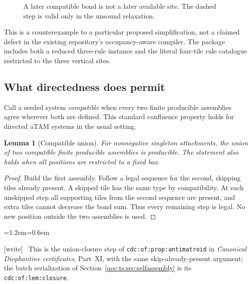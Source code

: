 \documentclass[11pt,letterpaper]{article}
\newtheorem{lemma}[theorem]{Lemma}
\theoremstyle{definition}
\theoremstyle{remark}
\newcommand{\wtag}{\textup{[write]}}
\newenvironment{writenote}{\par\smallskip\begin{list}{}{\leftmargin=1.2em\rightmargin=0.6em}\item[]\small\wtag\ }{\end{list}\smallskip}
\newcommand{\lab}[1]{\nolinkurl{#1}}
\begin{document}
\begin{figure}[ht]
\centering
{}
\caption{A later compatible bond is not a later available site. The dashed
step is valid only in the unsound relaxation.}
\end{figure}

This is a counterexample to a particular proposed simplification, not a
claimed defect in the existing repository's occupancy-aware compiler.
The package includes both a reduced three-rule instance and the literal
four-tile rule catalogue restricted to the three vertical sites.

\subsection{What directedness does permit}
Call a seeded system \emph{compatible} when every two finite producible
assemblies agree wherever both are defined. This standard confluence
property holds for directed aTAM systems in the usual setting.

\begin{lemma}[Compatible union]\label{qoc:ts:lem:union}
For nonnegative singleton attachments, the union of two compatible finite
producible assemblies is producible. The statement also holds when all
positions are restricted to a fixed box.
\end{lemma}
\begin{proof}
Build the first assembly. Follow a legal sequence for the second, skipping
tiles already present. A skipped tile has the same type by compatibility.
At each unskipped step all supporting tiles from the second sequence are
present, and extra tiles cannot decrease the bond sum. Thus every remaining
step is legal. No new position outside the two assemblies is used.
\end{proof}

\begin{writenote}
This is the union-closure step of \lab{cdc:of:prop:antimatroid} in \emph{Canonical Diophantine certificates}, Part~XI, with the same skip-already-present argument; the batch serialization of Section~\ref{qoc:ts:sec:selfassembly} is its \lab{cdc:of:lem:closure}.
\end{writenote}
\end{document}
